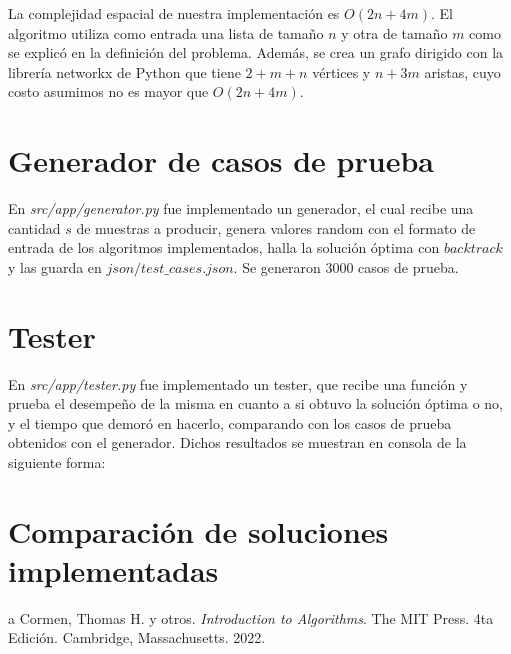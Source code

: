 \documentclass[10pt]{article} %
\begin{document}
	La complejidad espacial de nuestra implementaci\'on es $O(2n + 4m)$. El algoritmo utiliza como entrada una lista de tama\~no $n$ y otra de tama\~no $m$ como se explic\'o en la definici\'on del problema. Adem\'as, se crea un grafo dirigido con la librer\'ia networkx de Python que tiene $2 + m + n$ v\'ertices y $n + 3m$ aristas, cuyo costo asumimos no es mayor que $O(2n + 4m)$.
		
	\section{Generador de casos de prueba}
	
	En \textit{src/app/generator.py} fue implementado un generador, el cual recibe una cantidad $ s $ de muestras a producir, genera valores random con el formato de entrada de los algoritmos implementados, halla la soluci\'on \'optima con $ backtrack $ y las guarda en $ json/test\_cases.json $. Se generaron 3000 casos de prueba.
	
	\section{Tester}
	En \textit{src/app/tester.py} fue implementado un tester, que recibe una funci\'on y prueba el desempe\~no de la misma en cuanto a si obtuvo la soluci\'on \'optima o no, y el tiempo que demor\'o en hacerlo, comparando con los casos de prueba obtenidos con el generador. Dichos resultados se muestran en consola de la siguiente forma:
%	 		
	 
	
	\section{Comparaci\'on de soluciones implementadas}


	
	\begin{thebibliography}
		a
		 Cormen, Thomas H. y otros. \emph{Introduction to Algorithms}. 
		The MIT Press.
		4ta Edici\'on.		
		Cambridge, Massachusetts.
		2022.
	\end{thebibliography}
\end{document}
